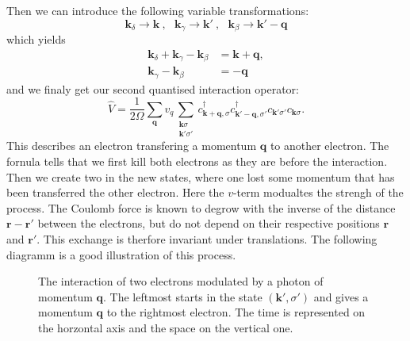 \documentclass[../main.tex]{subfile}
\begin{document}
Then we can introduce the following variable transformations:
\[
    \bm{k}_{\delta} \rightarrow \bm{k} ~,~~~ \bm{k}_{\gamma} \rightarrow \bm{k}' ~,~~~ \bm{k}_{\beta} \rightarrow \bm{k}' - \bm{q}
\]
which yields
\begin{align*}
    \bm{k}_{\delta} + \bm{k}_{\gamma} - \bm{k}_{\beta} &= \bm{k}+ \bm{q},\\
    \bm{k}_{\gamma} - \bm{k}_{\beta} &=  -\bm{q}
\end{align*}
and we finaly get our second quantised interaction operator:
\[
    \hat{V} = \frac{1}{2\Omega} \sum_{\bm{q}}v_{q} \sum_{\substack{\bm{k}\sigma\\\bm{k}'\sigma'}} c^{\dagger}_{\bm{k}+\bm{q},\sigma}c^{\dagger}_{\bm{k}'-\bm{q},\sigma'}c_{\bm{k}'\sigma'}c_{\bm{k}\sigma}.
\]
This describes an electron transfering a momentum $\bm{q}$ to another electron. The fornula tells that we first kill both electrons as they are before the interaction.
Then we create two in the new states, where one lost some momentum that has been transferred the other electron. Here the $v$-term modualtes the strengh of the process. 
The Coulomb force is known to degrow with the inverse of the distance $\bm{r}-\bm{r}'$
between the electrons, but do not depend on their respective positions $\bm{r}$ and $\bm{r}'$. This exchange is therfore invariant under translations.
The following diagramm is a good illustration of this process.\\
\begin{figure}[H]
    \centering

    \caption{The interaction of two electrons modulated by a photon of momentum $\bm{q}$. The leftmost starts in the state  $(\bm{k}', \sigma')$ and gives 
    a momentum $\bm{q}$ to the rightmost electron. The time is represented on the horzontal axis and the space on the vertical one.}
    \label{fig:photon_exchange}
\end{figure}
\end{document}
